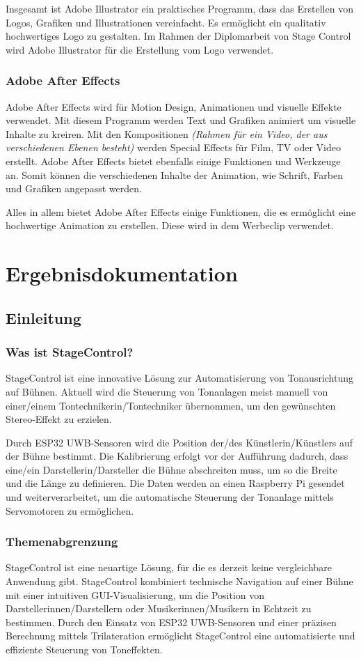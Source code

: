 Insgesamt ist Adobe Illustrator ein praktisches Programm, dass das Erstellen von Logos, Grafiken und Illustrationen vereinfacht. Es ermöglicht ein qualitativ hochwertiges Logo zu gestalten. Im Rahmen der Diplomarbeit von Stage Control wird Adobe Illustrator für die Erstellung vom Logo verwendet. 

\subsection{Adobe After Effects}
Adobe After Effects wird für Motion Design, Animationen und visuelle Effekte verwendet. Mit diesem Programm werden Text und Grafiken animiert um visuelle Inhalte zu kreiren. Mit den Kompositionen \textit{(Rahmen für ein Video, der aus verschiedenen Ebenen besteht)} werden Special Effects für Film, TV oder Video erstellt. Adobe After Effects bietet ebenfalls einige Funktionen und Werkzeuge an. Somit können die verschiedenen Inhalte der Animation, wie Schrift, Farben und Grafiken angepasst werden. \parencite{AdobeAfterEffects}

Alles in allem bietet Adobe After Effects einige Funktionen, die es ermöglicht eine hochwertige Animation zu erstellen. Diese wird in dem Werbeclip verwendet. 
\chapter{Ergebnisdokumentation}
\section{Einleitung}
\subsection{Was ist StageControl?}
StageControl ist eine innovative Lösung zur Automatisierung von Tonausrichtung auf Bühnen. Aktuell wird die Steuerung von Tonanlagen meist manuell von einer/einem Tontechnikerin/Tontechniker übernommen, um den gewünschten Stereo-Effekt zu erzielen.

Durch ESP32 UWB-Sensoren wird die Position der/des Künstlerin/Künstlers auf der Bühne bestimmt. Die Kalibrierung erfolgt vor der Aufführung dadurch, dass eine/ein Darstellerin/Darsteller die Bühne abschreiten muss, um so die Breite und die Länge zu definieren. Die Daten werden an einen Raspberry Pi gesendet und weiterverarbeitet, um die automatische Steuerung der Tonanlage mittels Servomotoren zu ermöglichen.

\subsection{Themenabgrenzung}
StageControl ist eine neuartige Lösung, für die es derzeit keine vergleichbare Anwendung gibt. StageControl kombiniert technische Navigation auf einer Bühne mit einer intuitiven GUI-Visualisierung, um die Position von Darstellerinnen/Darstellern oder Musikerinnen/Musikern in Echtzeit zu bestimmen. Durch den Einsatz von ESP32 UWB-Sensoren und einer präzisen Berechnung mittels Trilateration ermöglicht StageControl eine automatisierte und effiziente Steuerung von Toneffekten.

